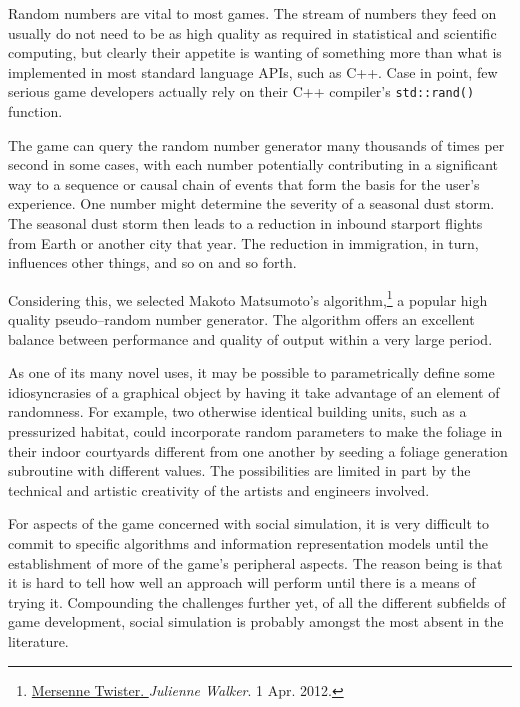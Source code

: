 Random numbers are vital to most games. The stream of numbers they feed on usually do not need to be as high quality as required in statistical and scientific computing, but clearly their appetite is wanting of something more than what is implemented in most standard language APIs, such as C++. Case in point, few serious game developers actually rely on their C++ compiler's {\tt std::rand()} function.

The game can query the random number generator many thousands of times per second in some cases, with each number potentially contributing in a significant way to a sequence or causal chain of events that form the basis for the user's experience. One number might determine the severity of a seasonal dust storm. The seasonal dust storm then leads to a reduction in inbound starport flights from Earth or another city that year. The reduction in immigration, in turn, influences other things, and so on and so forth.

Considering this, we selected Makoto Matsumoto's algorithm,\footnote{\href{http://www.eternallyconfuzzled.com/tuts/algorithms/jsw_tut_rand.aspx\#mersenne}{Mersenne Twister. }{\it Julienne Walker}. 1 Apr. 2012.} a popular high quality pseudo--random number generator. The algorithm offers an excellent balance between performance and quality of output within a very large period.

As one of its many novel uses, it may be possible to parametrically define some idiosyncrasies of a graphical object by having it take advantage of an element of randomness. For example, two otherwise identical building units, such as a pressurized habitat, could incorporate random parameters to make the foliage in their indoor courtyards different from one another by seeding a foliage generation subroutine with different values. The possibilities are limited in part by the technical and artistic creativity of the artists and engineers involved.

For aspects of the game concerned with social simulation, it is very difficult to commit to specific algorithms and information representation models until the establishment of more of the game's peripheral aspects. The reason being is that it is hard to tell how well an approach will perform until there is a means of trying it. Compounding the challenges further yet, of all the different subfields of game development, social simulation is probably amongst the most absent in the literature.

